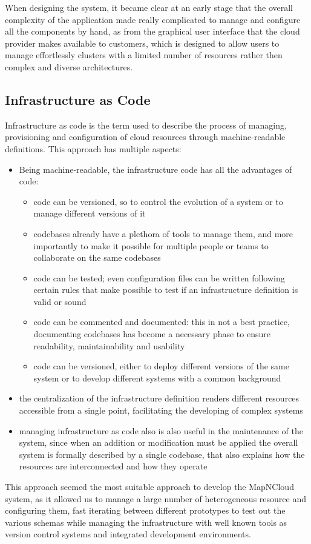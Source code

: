When designing the system, it became clear at an early stage that the overall complexity of the application made really complicated to manage and configure all the components by hand, as from the graphical user interface that the cloud provider makes available to customers, which is designed to allow users to manage effortlessly clusters with a limited number of resources rather then complex and diverse architectures.

\subsection{Infrastructure as Code}
  Infrastructure as code is the term used to describe the process of managing, provisioning and configuration of cloud resources through machine-readable definitions. This approach has multiple aspects:
  \begin{itemize}
    \item Being machine-readable, the infrastructure code has all the advantages of code:
      \begin{itemize}
        \item code can be versioned, so to control the evolution of a system or to manage different versions of it
        \item codebases already have a plethora of tools to manage them, and more importantly to make it possible for multiple people or teams to collaborate on the same codebases
        \item code can be tested; even configuration files can be written following certain rules that make possible to test if an infrastructure definition is valid or sound
        \item code can be commented and documented: this in not a best practice, documenting codebases has become a necessary phase to ensure readability, maintainability and usability
        \item code can be versioned, either to deploy different versions of the same system or to develop different systems with a common background
      \end{itemize}
    \item the centralization of the infrastructure definition renders different resources accessible from a single point, facilitating the developing of complex systems
    \item managing infrastructure as code also is also useful in the maintenance of the system, since when an addition or modification must be applied the overall system is formally described by a single codebase, that also explains how the resources are interconnected and how they operate
  \end{itemize}
  This approach seemed the most suitable approach to develop the MapNCloud system, as it allowed us to manage a large number of heterogeneous resource and configuring them, fast iterating between different prototypes to test out the various schemas while managing the infrastructure with well known tools as version control systems and integrated development environments.
